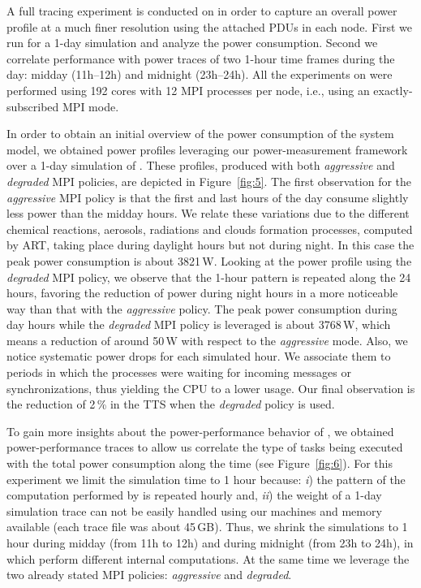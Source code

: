 A full tracing  experiment is conducted on \tinto  in order to capture
an overall power profile at a much finer resolution using the attached
PDUs in each  node. First we run \cosmoart for  a 1-day simulation and
analyze the  power consumption.  Second we  correlate performance with
power  traces  of  two  1-hour  time frames  during  the  day:  midday
(11h--12h) and midnight (23h--24h). All the experiments on \tinto were performed
using 192 cores with 12 MPI processes per node, i.e., using an exactly-subscribed MPI mode.

In order to obtain an initial overview of the power consumption of the
system  model,  we  obtained  power  profiles  leveraging  our  \pmlib
power-measurement    framework   over    a    1-day   simulation    of
\cosmoart. These profiles, produced with both \emph{aggressive} and \emph{degraded} MPI
policies,  are depicted in  Figure~\ref{fig:5}. The  first observation
for the \emph{aggressive} MPI policy is that the first and last hours of the day
consume slightly less  power than the midday hours.  We relate these
variations  due   to  the  different   chemical  reactions,  aerosols,
radiations  and clouds  formation processes,  computed by  ART, taking
place during  daylight hours  but not during  night. In this  case the
peak power consumption is about  3821\,W. Looking at the power profile
using the \emph{degraded}  MPI policy, we observe that  the 1-hour pattern is
repeated along  the 24 hours, favoring  the reduction of  power during
night  hours in  a  more noticeable  way  than that  with the   \emph{aggressive}
policy.   The peak  power consumption  during day  hours  while the
 \emph{degraded}  MPI policy  is leveraged  is  about 3768\,W,  which means  a
reduction of around  50\,W with respect to the  \emph{aggressive} mode. Also, we
notice systematic  power drops for each simulated  hour.  We associate
them  to periods  in  which  the processes  were waiting  for
incoming messages  or synchronizations, thus  yielding the CPU  to a lower
usage. Our final observation is the reduction of 2\,\% in the TTS when the \emph{degraded} policy is used.

To  gain  more  insights   about  the  power-performance  behavior  of
\cosmoart,  we  obtained power-per\-for\-man\-ce  traces  to allow  us
correlate  the type  of  tasks  being executed  with  the total  power
consumption  along  the   time  (see  Figure~\ref{fig:6}).   For  this
experiment we  limit the simulation  time to 1 hour  because: \emph{i})
the  pattern of  the computation  performed by  \cosmoart  is repeated
hourly and, \emph{ii}) the weight  of a 1-day simulation trace can not
be easily handled using our  machines and memory available (each trace
file was about 45\,GB). Thus, we shrink the simulations
to 1 hour during midday (from 11h  to 12h) and during
midnight  (from 23h  to  24h), in  which  \cosmoart perform  different
internal computations.  At  the same time we leverage  the two already
stated MPI policies: \emph{aggressive} and \emph{degraded}.

